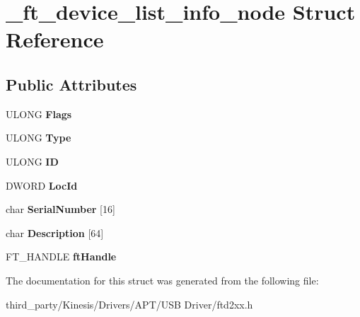 \hypertarget{struct__ft__device__list__info__node}{}\section{\+\_\+ft\+\_\+device\+\_\+list\+\_\+info\+\_\+node Struct Reference}
\label{struct__ft__device__list__info__node}
\subsection*{Public Attributes}
\begin{DoxyCompactItemize}
\item 
U\+L\+O\+NG {\bfseries Flags}\hypertarget{struct__ft__device__list__info__node_a721b47fa89702eff50b231f17c4298e6}{}\label{struct__ft__device__list__info__node_a721b47fa89702eff50b231f17c4298e6}

\item 
U\+L\+O\+NG {\bfseries Type}\hypertarget{struct__ft__device__list__info__node_aa764a1406eb904ad4444a82f2f950b4e}{}\label{struct__ft__device__list__info__node_aa764a1406eb904ad4444a82f2f950b4e}

\item 
U\+L\+O\+NG {\bfseries ID}\hypertarget{struct__ft__device__list__info__node_a6f486d775e8b49190ec48e99cdbdcbe5}{}\label{struct__ft__device__list__info__node_a6f486d775e8b49190ec48e99cdbdcbe5}

\item 
D\+W\+O\+RD {\bfseries Loc\+Id}\hypertarget{struct__ft__device__list__info__node_a11f8898a6bc9a91abadb14c02cac4394}{}\label{struct__ft__device__list__info__node_a11f8898a6bc9a91abadb14c02cac4394}

\item 
char {\bfseries Serial\+Number} \mbox{[}16\mbox{]}\hypertarget{struct__ft__device__list__info__node_a833aa1d16c8e1034840397921ae92413}{}\label{struct__ft__device__list__info__node_a833aa1d16c8e1034840397921ae92413}

\item 
char {\bfseries Description} \mbox{[}64\mbox{]}\hypertarget{struct__ft__device__list__info__node_a2ed17bec72cbe5e73a2e83cd29a8e681}{}\label{struct__ft__device__list__info__node_a2ed17bec72cbe5e73a2e83cd29a8e681}

\item 
F\+T\+\_\+\+H\+A\+N\+D\+LE {\bfseries ft\+Handle}\hypertarget{struct__ft__device__list__info__node_a3a26fc5e6180c4f87dec4ebf1951d100}{}\label{struct__ft__device__list__info__node_a3a26fc5e6180c4f87dec4ebf1951d100}

\end{DoxyCompactItemize}


The documentation for this struct was generated from the following file\+:\begin{DoxyCompactItemize}
\item 
third\+\_\+party/\+Kinesis/\+Drivers/\+A\+P\+T/\+U\+S\+B Driver/ftd2xx.\+h\end{DoxyCompactItemize}
